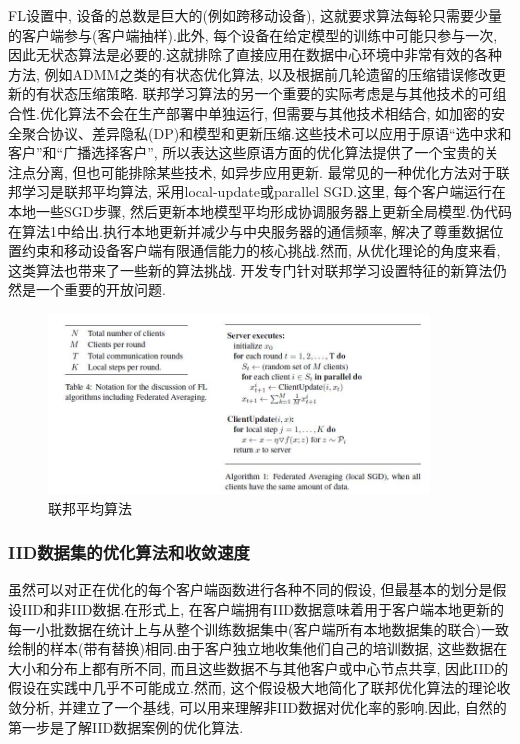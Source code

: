 \documentclass[a4paper]{article}
\begin{document}
FL设置中, 设备的总数是巨大的(例如跨移动设备), 这就要求算法每轮只需要少量的客户端参与(客户端抽样).此外, 每个设备在给定模型的训练中可能只参与一次, 因此无状态算法是必要的.这就排除了直接应用在数据中心环境中非常有效的各种方法, 例如ADMM之类的有状态优化算法, 以及根据前几轮遗留的压缩错误修改更新的有状态压缩策略.
联邦学习算法的另一个重要的实际考虑是与其他技术的可组合性.优化算法不会在生产部署中单独运行, 但需要与其他技术相结合, 如加密的安全聚合协议、差异隐私(DP)和模型和更新压缩.这些技术可以应用于原语“选中求和客户”和“广播选择客户”, 所以表达这些原语方面的优化算法提供了一个宝贵的关注点分离, 但也可能排除某些技术, 如异步应用更新.
最常见的一种优化方法对于联邦学习是联邦平均算法\citep{mcmahan2016communication}, 采用local-update或parallel SGD.这里, 每个客户端运行在本地一些SGD步骤, 然后更新本地模型平均形成协调服务器上更新全局模型.伪代码在算法1中给出.执行本地更新并减少与中央服务器的通信频率, 解决了尊重数据位置约束和移动设备客户端有限通信能力的核心挑战.然而, 从优化理论的角度来看, 这类算法也带来了一些新的算法挑战. 开发专门针对联邦学习设置特征的新算法仍然是一个重要的开放问题.
\begin{figure}[ht]
    \setlength{\abovecaptionskip}{0.1cm}
    \centering    
    \includegraphics[width=0.9\textwidth]{Federated_Averging.jpg}
    \caption{联邦平均算法}
\end{figure}

\subsubsection{ IID数据集的优化算法和收敛速度}

虽然可以对正在优化的每个客户端函数进行各种不同的假设, 但最基本的划分是假设IID和非IID数据.在形式上, 在客户端拥有IID数据意味着用于客户端本地更新的每一小批数据在统计上与从整个训练数据集中(客户端所有本地数据集的联合)一致绘制的样本(带有替换)相同.由于客户独立地收集他们自己的培训数据, 这些数据在大小和分布上都有所不同, 而且这些数据不与其他客户或中心节点共享, 因此IID的假设在实践中几乎不可能成立.然而, 这个假设极大地简化了联邦优化算法的理论收敛分析, 并建立了一个基线, 可以用来理解非IID数据对优化率的影响.因此, 自然的第一步是了解IID数据案例的优化算法.
 
\end{document}
